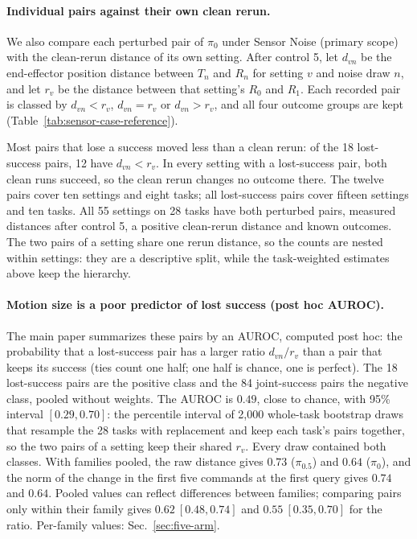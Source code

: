 \paragraph{Individual pairs against their own clean rerun.}
We also compare each perturbed pair of $\pi_0$ under Sensor Noise (primary scope) with the clean-rerun distance of its own setting. After control 5, let $d_{vn}$ be the end-effector position distance between $T_n$ and $R_n$ for setting $v$ and noise draw $n$, and let $r_v$ be the distance between that setting's $R_0$ and $R_1$. Each recorded pair is classed by $d_{vn}<r_v$, $d_{vn}=r_v$ or $d_{vn}>r_v$, and all four outcome groups are kept (Table~\ref{tab:sensor-case-reference}).

Most pairs that lose a success moved less than a clean rerun: of the 18 lost-success pairs, 12 have $d_{vn}<r_v$. In every setting with a lost-success pair, both clean runs succeed, so the clean rerun changes no outcome there. The twelve pairs cover ten settings and eight tasks; all lost-success pairs cover fifteen settings and ten tasks. All 55 settings on 28 tasks have both perturbed pairs, measured distances after control 5, a positive clean-rerun distance and known outcomes. The two pairs of a setting share one rerun distance, so the counts are nested within settings: they are a descriptive split, while the task-weighted estimates above keep the hierarchy.

\paragraph{Motion size is a poor predictor of lost success (post hoc AUROC).}
The main paper summarizes these pairs by an AUROC, computed post hoc: the probability that a lost-success pair has a larger ratio $d_{vn}/r_v$ than a pair that keeps its success (ties count one half; one half is chance, one is perfect). The 18 lost-success pairs are the positive class and the 84 joint-success pairs the negative class, pooled without weights. The AUROC is $0.49$, close to chance, with 95\% interval $[0.29,0.70]$: the percentile interval of 2{,}000 whole-task bootstrap draws that resample the 28 tasks with replacement and keep each task's pairs together, so the two pairs of a setting keep their shared $r_v$. Every draw contained both classes. With families pooled, the raw distance gives $0.73$ ($\pi_{0.5}$) and $0.64$ ($\pi_0$), and the norm of the change in the first five commands at the first query gives $0.74$ and $0.64$. Pooled values can reflect differences between families; comparing pairs only within their family gives $0.62\ [0.48,0.74]$ and $0.55\ [0.35,0.70]$ for the ratio. Per-family values: Sec.~\ref{sec:five-arm}.


